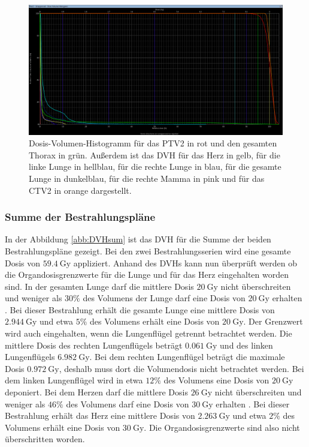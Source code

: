 \begin{figure}[H]
  \centering
  \includegraphics[width=\textwidth]{Bilder/DVH2.png}
  \caption{Dosis-Volumen-Histogramm für das PTV2 in rot und den gesamten Thorax in grün. Außerdem ist das DVH für das Herz in gelb, für die linke Lunge in hellblau, für die rechte Lunge in blau, für die gesamte Lunge in dunkelblau, für die rechte Mamma in pink und für das CTV2 in orange dargestellt.}
  \label{abb:DVH2}
\end{figure}


\subsubsection*{Summe der Bestrahlungspläne}

In der Abbildung \ref{abb:DVHsum} ist das DVH für die Summe der beiden Bestrahlungspläne
gezeigt. Bei den zwei Bestrahlungsserien wird eine gesamte Dosis von $\SI{59,4}{\gray}$ appliziert.
Anhand des DVHs kann nun überprüft werden ob die Organdosisgrenzwerte für die Lunge und für
das Herz eingehalten worden sind. In der gesamten Lunge darf die mittlere Dosis $\SI{20}{\gray}$ nicht
überschreiten und weniger als $30\%$ des Volumens der Lunge darf eine Dosis von $\SI{20}{\gray}$ erhalten \cite{grenz}.
Bei dieser Bestrahlung erhält die gesamte Lunge eine mittlere Dosis von $\SI{2,944}{\gray}$ und etwa $5\%$ des Volumens
erhält eine Dosis von $\SI{20}{\gray}$.
Der Grenzwert wird auch eingehalten, wenn die Lungenflügel getrennt betrachtet werden.
Die mittlere Dosis des rechten Lungenflügels beträgt $\SI{0.061}{\gray}$ und des linken Lungenflügels $\SI{6.982}{\gray}$.
Bei dem rechten Lungenflügel beträgt die maximale Dosis $\SI{0.972}{\gray}$, deshalb muss dort die Volumendosis nicht betrachtet werden.
Bei dem linken Lungenflügel wird in etwa $12\%$ des Volumens eine Dosis von $\SI{20}{\gray}$ deponiert.
Bei dem Herzen darf die mittlere Dosis $\SI{26}{\gray}$ nicht überschreiten
und weniger als $46\%$ des Volumens darf eine Dosis von $\SI{30}{\gray}$ erhalten \cite{grenz}.
Bei dieser Bestrahlung erhält das Herz eine mittlere Dosis von $\SI{2,263}{\gray}$ und etwa $2\%$ des Volumens
erhält eine Dosis von $\SI{30}{\gray}$. Die Organdosisgrenzwerte sind also nicht überschritten worden.

